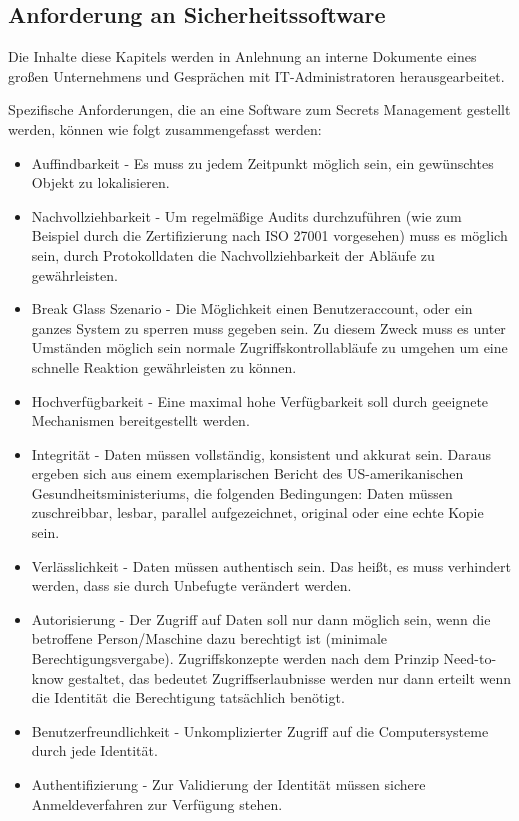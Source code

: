 \documentclass[
book,
a4paper,   
titlepage,  
halfparskip,
12pt        
]{scrartcl}
\begin{document}
\begin{onehalfspacing}
\subsection{Anforderung an Sicherheitssoftware}
\label{subsubsec:anforderung}
Die Inhalte diese Kapitels werden in Anlehnung an interne Dokumente eines großen Unternehmens und Gesprächen mit \ac{IT}-Administratoren herausgearbeitet.

Spezifische Anforderungen, die an eine Software zum Secrets Management gestellt werden, können wie folgt zusammengefasst werden:

\begin{itemize}
  \item Auffindbarkeit - Es muss zu jedem Zeitpunkt möglich sein, ein gewünschtes Objekt zu lokalisieren.\cite[S. 3]{kerberos2}
  \item Nachvollziehbarkeit - Um regelmäßige Audits durchzuführen (wie zum Beispiel durch die Zertifizierung nach ISO 27001 vorgesehen\cite[S. 17]{risiko}) muss es möglich sein, durch Protokolldaten die Nachvollziehbarkeit der Abläufe zu gewährleisten.
  \item Break Glass Szenario - Die Möglichkeit einen Benutzeraccount, oder ein ganzes System zu sperren muss gegeben sein. Zu diesem Zweck muss es unter Umständen möglich sein normale Zugriffskontrollabläufe zu umgehen um eine schnelle Reaktion gewährleisten zu können.\cite{break}
  \item Hochverfügbarkeit - Eine maximal hohe Verfügbarkeit soll durch geeignete Mechanismen bereitgestellt werden.\cite[S. 3]{ha} 
  \item Integrität - Daten müssen vollständig, konsistent und akkurat sein. Daraus ergeben sich aus einem exemplarischen Bericht des US-amerikanischen Gesundheitsministeriums, die folgenden Bedingungen: Daten müssen zuschreibbar, lesbar, parallel aufgezeichnet, original oder eine echte Kopie sein.\cite[S. 2]{health}
  \item Verlässlichkeit - Daten müssen authentisch sein. Das heißt, es muss verhindert werden, dass sie durch Unbefugte verändert werden.
  \item Autorisierung - Der Zugriff auf Daten soll nur dann möglich sein, wenn die betroffene Person/Maschine dazu berechtigt ist (minimale Berechtigungsvergabe). Zugriffskonzepte werden nach dem Prinzip Need-to-know gestaltet, das bedeutet Zugriffserlaubnisse werden nur dann erteilt wenn die Identität die Berechtigung tatsächlich benötigt.
  \item Benutzerfreundlichkeit - Unkomplizierter Zugriff auf die Computersysteme durch jede Identität.
  \item Authentifizierung - Zur Validierung der Identität  müssen sichere Anmeldeverfahren zur Verfügung stehen.
\end{itemize}


\end{onehalfspacing}
\end{document}
